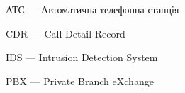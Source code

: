 \newpage
{}
\begin{ESKDexplanation}
  \item АТС --- Автоматична телефонна станція
  \item CDR --- Call Detail Record
  \item IDS --- Intrusion Detection System
  \item PBX --- Private Branch eXchange
\end{ESKDexplanation}
